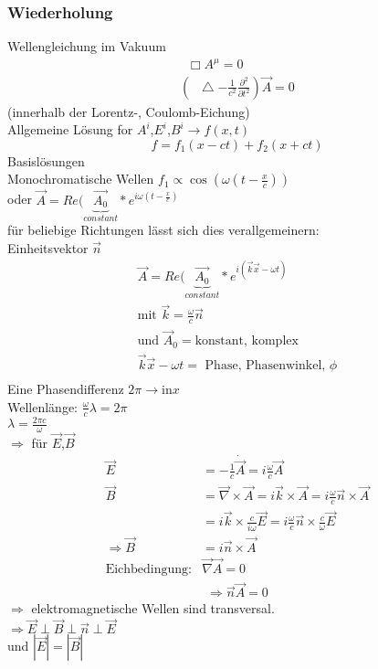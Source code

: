\documentclass[a4paper]{article}
\newcommand*\laplace{\mathop{}\!\mathbin\bigtriangleup}
\newcommand*\dalembert{\mathop{}\!\mathbin\Box}
\begin{document}
\subsubsection{Wiederholung}
Wellengleichung im Vakuum 
\begin{align}
\dalembert A^\mu=0\\
\left( \laplace - \frac{1}{c^2} \frac{\partial^2}{\partial t^2} \right)\vec{A}=0
\end{align}
(innerhalb der Lorentz-, Coulomb-Eichung)\\
Allgemeine Lösung for $A^i$,$E^i$,$B^i\rightarrow f(x,t)$
\begin{equation}
f=f_1(x-ct)+f_2(x+ct)
\end{equation}
Basislösungen\\
Monochromatische Wellen $f_1\propto \cos(\omega \left( t-\frac{x}{c}
\right))$\\
oder $\vec{A}=Re(\underbrace{\vec{A_0}}_{constant} *
e^{i\omega(t-\frac{x}{c})}$\\ 
für beliebige Richtungen lässt sich dies verallgemeinern:\\
Einheitsvektor $\vec{n}$ 
\begin{align}
\vec{A}=Re(\underbrace{\vec{A_0}}_{constant} * e^{i(\vec{k}\vec{x}-\omega t)}\\
\text{mit }\vec{k}=\frac{\omega}{c}\vec{n}\\
\text{und }\vec{A}_0= \text{konstant, komplex}\\
\vec{k}\vec{x}-\omega t =\text{ Phase, Phasenwinkel, }\phi\\
\end{align}
Eine Phasendifferenz $2\pi \rightarrow \text{in} x$\\
Wellenlänge: $\frac{\omega}{c}\lambda=2\pi$\\
$\lambda=\frac{2\pi c}{\omega}$\\
$\Rightarrow$ für $\vec{E}$,$\vec{B}$
\begin{align}
\vec{E}&=-\frac{1}{c}\dot{\vec{A}}=i\frac{\omega}{c}\vec{A}\\
\vec{B}&=\vec{\nabla}\times\vec{A}=i\vec{k}\times\vec{A}=i\frac{\omega}{c}\vec{n}\times\vec{A}\\
&=i\vec{k}\times\frac{c}{i\omega}\vec{E}=i\frac{\omega}{c}\vec{n}\times\frac{c}{\omega}\vec{E}\\
\Rightarrow \vec{B}&=i\vec{n}\times\vec{A}\\
\text{Eichbedingung}: & \vec{\nabla}\vec{A}=0
\end{align}
\begin{align}
\Rightarrow \vec{n}\vec{A}=0
\end{align}
$\Rightarrow$ elektromagnetische Wellen sind transversal.\\
$\Rightarrow \vec{E}\perp\vec{B}\perp\vec{n}\perp\vec{E}$\\
und $|\vec{E}|=|\vec{B}|$\\
\end{document}
